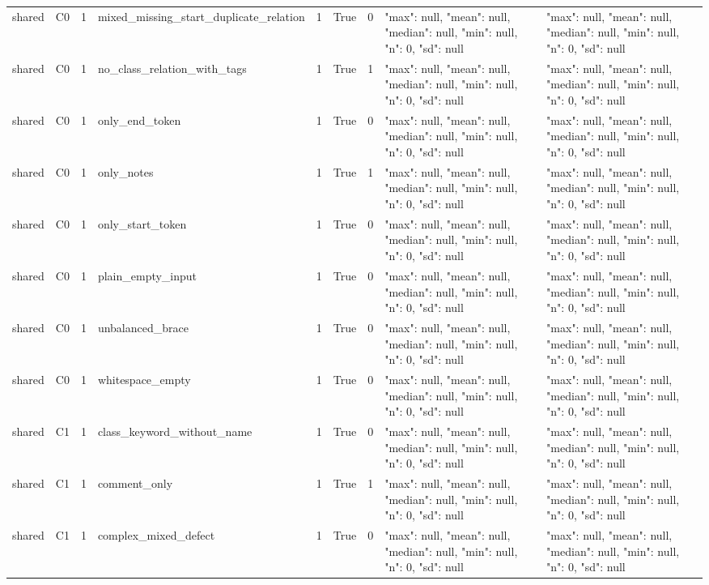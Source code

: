 \begin{tabular}{lllllllll}
shared & C0 & 1 & mixed\_missing\_start\_duplicate\_relation & 1 & True & 0 & {"max": null, "mean": null, "median": null, "min": null, "n": 0, "sd": null} & {"max": null, "mean": null, "median": null, "min": null, "n": 0, "sd": null} \\
shared & C0 & 1 & no\_class\_relation\_with\_tags & 1 & True & 1 & {"max": null, "mean": null, "median": null, "min": null, "n": 0, "sd": null} & {"max": null, "mean": null, "median": null, "min": null, "n": 0, "sd": null} \\
shared & C0 & 1 & only\_end\_token & 1 & True & 0 & {"max": null, "mean": null, "median": null, "min": null, "n": 0, "sd": null} & {"max": null, "mean": null, "median": null, "min": null, "n": 0, "sd": null} \\
shared & C0 & 1 & only\_notes & 1 & True & 1 & {"max": null, "mean": null, "median": null, "min": null, "n": 0, "sd": null} & {"max": null, "mean": null, "median": null, "min": null, "n": 0, "sd": null} \\
shared & C0 & 1 & only\_start\_token & 1 & True & 0 & {"max": null, "mean": null, "median": null, "min": null, "n": 0, "sd": null} & {"max": null, "mean": null, "median": null, "min": null, "n": 0, "sd": null} \\
shared & C0 & 1 & plain\_empty\_input & 1 & True & 0 & {"max": null, "mean": null, "median": null, "min": null, "n": 0, "sd": null} & {"max": null, "mean": null, "median": null, "min": null, "n": 0, "sd": null} \\
shared & C0 & 1 & unbalanced\_brace & 1 & True & 0 & {"max": null, "mean": null, "median": null, "min": null, "n": 0, "sd": null} & {"max": null, "mean": null, "median": null, "min": null, "n": 0, "sd": null} \\
shared & C0 & 1 & whitespace\_empty & 1 & True & 0 & {"max": null, "mean": null, "median": null, "min": null, "n": 0, "sd": null} & {"max": null, "mean": null, "median": null, "min": null, "n": 0, "sd": null} \\
shared & C1 & 1 & class\_keyword\_without\_name & 1 & True & 0 & {"max": null, "mean": null, "median": null, "min": null, "n": 0, "sd": null} & {"max": null, "mean": null, "median": null, "min": null, "n": 0, "sd": null} \\
shared & C1 & 1 & comment\_only & 1 & True & 1 & {"max": null, "mean": null, "median": null, "min": null, "n": 0, "sd": null} & {"max": null, "mean": null, "median": null, "min": null, "n": 0, "sd": null} \\
shared & C1 & 1 & complex\_mixed\_defect & 1 & True & 0 & {"max": null, "mean": null, "median": null, "min": null, "n": 0, "sd": null} & {"max": null, "mean": null, "median": null, "min": null, "n": 0, "sd": null} \\

\end{tabular}
